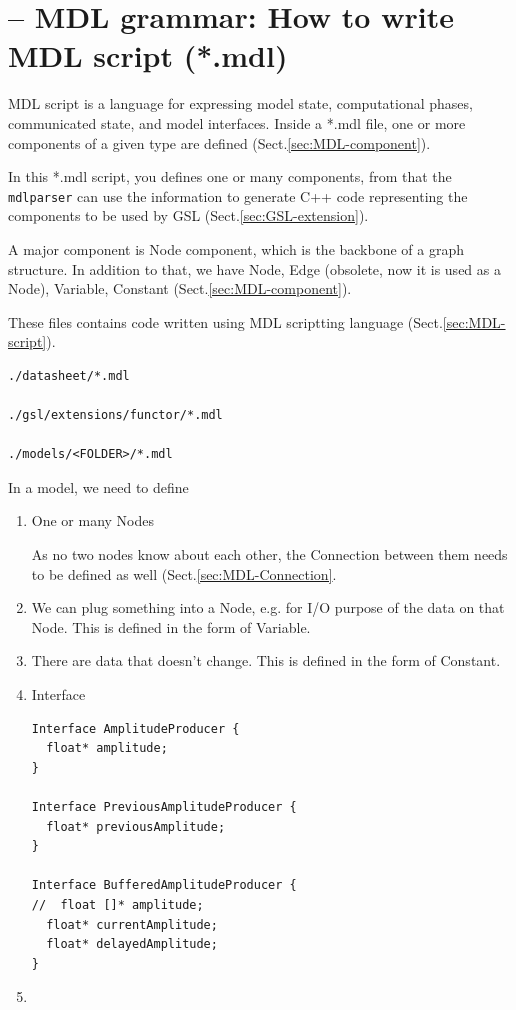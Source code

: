 \section{-- MDL grammar: How to write MDL script (*.mdl)}
\label{sec:MDL-script-structure}
\label{sec:MDL-script}

MDL script is a language for expressing model state, computational phases,
communicated state, and model interfaces.
Inside a *.mdl file, one or more components of a given type are defined
(Sect.\ref{sec:MDL-component}).


In this *.mdl script, you defines one or many components, from that the
\verb!mdlparser! can use the information to generate C++ code representing
the components to be used by GSL (Sect.\ref{sec:GSL-extension}).

A major component is Node component, which is the backbone of a graph structure.
In addition to that, we have Node, Edge (obsolete, now it is used as a Node),
Variable, Constant (Sect.\ref{sec:MDL-component}).

\begin{mdframed}
These files contains code written using MDL scriptting language
(Sect.\ref{sec:MDL-script}).

\begin{verbatim}
./datasheet/*.mdl

./gsl/extensions/functor/*.mdl

./models/<FOLDER>/*.mdl
\end{verbatim}
\end{mdframed}


In a model, we need to define
\begin{enumerate}
  \item One or many Nodes
  
  As no two nodes know about each other, 
  the Connection between them needs to be defined as well
  (Sect.\ref{sec:MDL-Connection}.
  

  
  \item We can plug something into a Node, e.g. for I/O purpose of the data on
  that Node. This is defined in the form of Variable.
  
  \item There are data that doesn't change. This is defined in the form of
  Constant. 
  
  \item Interface
  
\begin{verbatim}
Interface AmplitudeProducer {
  float* amplitude;
}

Interface PreviousAmplitudeProducer {
  float* previousAmplitude;
}

Interface BufferedAmplitudeProducer {
//  float []* amplitude;
  float* currentAmplitude;
  float* delayedAmplitude;
}
\end{verbatim}

 
  \item 
\end{enumerate}


